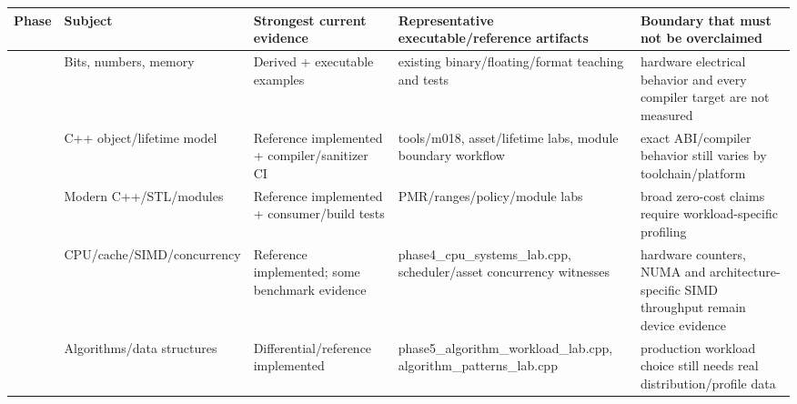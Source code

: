 {\def\LTcaptype{none} %
\begin{longtable}[]{@{}
  >{\raggedright\arraybackslash}p{}
  >{\raggedright\arraybackslash}p{}
  >{\raggedright\arraybackslash}p{}
  >{\raggedright\arraybackslash}p{}
  >{\raggedright\arraybackslash}p{}@{}}
\toprule\noalign{}
\begin{minipage}[b]{\linewidth}\raggedright
Phase
\end{minipage} & \begin{minipage}[b]{\linewidth}\raggedright
Subject
\end{minipage} & \begin{minipage}[b]{\linewidth}\raggedright
Strongest current evidence
\end{minipage} & \begin{minipage}[b]{\linewidth}\raggedright
Representative executable/reference artifacts
\end{minipage} & \begin{minipage}[b]{\linewidth}\raggedright
Boundary that must not be overclaimed
\end{minipage} \\
\midrule\noalign{}
\endhead
\bottomrule\noalign{}
\endlastfoot
1 & Bits, numbers, memory & Derived + executable examples & existing binary/floating/format teaching and tests & hardware electrical behavior and every compiler target are not measured \\
2 & C++ object/lifetime model & Reference implemented + compiler/sanitizer CI & tools/m018, asset/lifetime labs, module boundary workflow & exact ABI/compiler behavior still varies by toolchain/platform \\
3 & Modern C++/STL/modules & Reference implemented + consumer/build tests & PMR/ranges/policy/module labs & broad zero-cost claims require workload-specific profiling \\
4 & CPU/cache/SIMD/concurrency & Reference implemented; some benchmark evidence & phase4\_cpu\_systems\_lab.cpp, scheduler/asset concurrency witnesses & hardware counters, NUMA and architecture-specific SIMD throughput remain device evidence \\
5 & Algorithms/data structures & Differential/reference implemented & phase5\_algorithm\_workload\_lab.cpp, algorithm\_patterns\_lab.cpp & production workload choice still needs real distribution/profile data \\

\end{longtable}}
